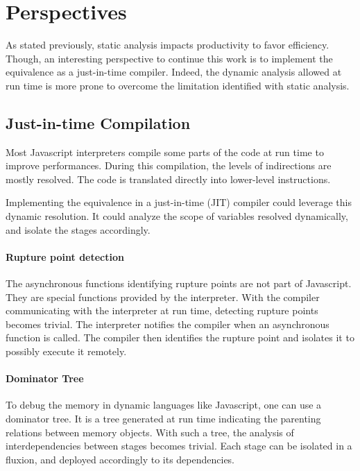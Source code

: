 \section{Perspectives} \label{chapter6:perspective}

As stated previously, static analysis impacts productivity to favor efficiency.
Though, an interesting perspective to continue this work is to implement the equivalence as a just-in-time compiler.
Indeed, the dynamic analysis allowed at run time is more prone to overcome the limitation identified with static analysis.

\subsection{Just-in-time Compilation}

Most Javascript interpreters compile some parts of the code at run time to improve performances.
During this compilation, the levels of indirections are mostly resolved.
The code is translated directly into lower-level instructions.

Implementing the equivalence in a just-in-time (JIT) compiler could leverage this dynamic resolution.
It could analyze the scope of variables resolved dynamically, and isolate the stages accordingly.

\paragraph{Rupture point detection}

The asynchronous functions identifying rupture points are not part of Javascript.
They are special functions provided by the interpreter.
With the compiler communicating with the interpreter at run time, detecting rupture points becomes trivial.
The interpreter notifies the compiler when an asynchronous function is called.
The compiler then identifies the rupture point and isolates it to possibly execute it remotely.

\paragraph{Dominator Tree}

To debug the memory in dynamic languages like Javascript, one can use a dominator tree.
It is a tree generated at run time indicating the parenting relations between memory objects.
With such a tree, the analysis of interdependencies between stages becomes trivial.
Each stage can be isolated in a fluxion, and deployed accordingly to its dependencies.

